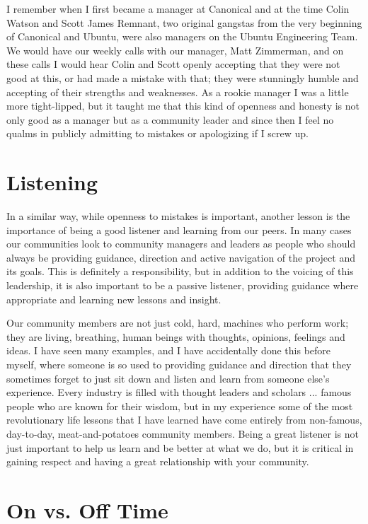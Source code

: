 I remember when I first became a manager at Canonical and at the time Colin
Watson and Scott James Remnant, two original gangstas from the very beginning of
Canonical and Ubuntu, were also managers on the Ubuntu Engineering Team. We
would have our weekly calls with our manager, Matt Zimmerman, and on these calls
I would hear Colin and Scott openly accepting that they were not good at this,
or had made a mistake with that; they were stunningly humble and accepting of
their strengths and weaknesses. As a rookie manager I was a little more
tight-lipped, but it taught me that this kind of openness and honesty is not
only good as a manager but as a community leader and since then I feel no qualms
in publicly admitting to mistakes or apologizing if I screw up.

\section*{Listening}

In a similar way, while openness to mistakes is important, another lesson is the
importance of being a good listener and learning from our peers. In many cases
our communities look to community managers and leaders as people who should
always be providing guidance, direction and active navigation of the project and
its goals. This is definitely a responsibility, but in addition to the voicing
of this leadership, it is also important to be a passive listener, providing
guidance where appropriate and learning new lessons and insight.

Our community members are not just cold, hard, machines who perform work; they
are living, breathing, human beings with thoughts, opinions, feelings and ideas.
I have seen many examples, and I have accidentally done this before myself,
where someone is so used to providing guidance and direction that they sometimes
forget to just sit down and listen and learn from someone else’s experience.
Every industry is filled with thought leaders and scholars ... famous people
who are known for their wisdom, but in my experience some of the most
revolutionary life lessons that I have learned have come entirely from
non-famous, day-to-day, meat-and-potatoes community members. Being a great
listener is not just important to help us learn and be better at what we do, but
it is critical in gaining respect and having a great relationship with your
community.

\section*{On vs. Off Time}


